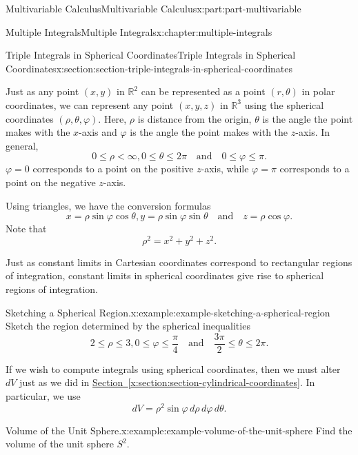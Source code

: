 \documentclass[twoside,10pt,]{book}
\newcommand{\xreffont}{\relax}
\numberwithin{equation}{part}
\newcommand{\qq}[1]{\quad\text{#1}\quad}
\newcommand{\lt}{<}
\begin{document}
\begin{partptx}{Multivariable Calculus}{}{Multivariable Calculus}{}{}{x:part:part-multivariable}
\begin{chapterptx}{Multiple Integrals}{}{Multiple Integrals}{}{}{x:chapter:multiple-integrals}
\begin{sectionptx}{Triple Integrals in Spherical Coordinates}{}{Triple Integrals in Spherical Coordinates}{}{}{x:section:section-triple-integrals-in-spherical-coordinates}
\par
Just as any point \((x,y)\) in \(\mathbb{R}^{2}\) can be represented as a point \((r,\theta)\) in polar coordinates, we can represent any point \((x,y,z)\) in \(\mathbb{R}^{3}\) using the spherical coordinates \((\rho, \theta,\varphi)\). Here, \(\rho\) is distance from the origin, \(\theta\) is the angle the point makes with the \(x\)-axis and \(\varphi\) is the angle the point makes with the \(z\)-axis. In general,%
\begin{equation*}
0\leq\rho\lt\infty, 0\leq\theta\leq2\pi\qq{and} 0\leq \varphi\leq \pi\text{.}
\end{equation*}
\(\varphi = 0\) corresponds to a point on the positive \(z\)-axis, while \(\varphi = \pi\) corresponds to a point on the negative \(z\)-axis.%
\par
Using triangles, we have the conversion formulas%
\begin{equation*}
x = \rho\sin\varphi\cos\theta, y = \rho\sin\varphi\sin\theta\qq{and} z = \rho\cos\varphi\text{.}
\end{equation*}
Note that%
\begin{equation*}
\rho^{2} = x^{2} + y^{2} + z^{2}\text{.}
\end{equation*}
%
\par
Just as constant limits in Cartesian coordinates correspond to rectangular regions of integration, constant limits in spherical coordinates give rise to spherical regions of integration.%
\begin{example}{Sketching a Spherical Region.}{x:example:example-sketching-a-spherical-region}%
Sketch the region determined by the spherical inequalities%
\begin{equation*}
2\leq \rho\leq 3, 0\leq \varphi\leq \frac{\pi}{4} \qq{and} \frac{3\pi}{2}\leq \theta\leq 2\pi\text{.}
\end{equation*}
%
\end{example}
If we wish to compute integrals using spherical coordinates, then we must alter \(dV\) just as we did in \hyperref[x:section:section-cylindrical-coordinates]{Section~{\xreffont\ref{x:section:section-cylindrical-coordinates}}}. In particular, we use%
\begin{equation*}
dV = \rho^{2}\sin\varphi\,d\rho\,d\varphi\,d\theta\text{.}
\end{equation*}
%
\begin{example}{Volume of the Unit Sphere.}{x:example:example-volume-of-the-unit-sphere}%
Find the volume of the unit sphere \(S^{2}\).%
\par\smallskip%

\end{example}
\end{sectionptx}
\end{chapterptx}
\end{partptx}
\end{document}
